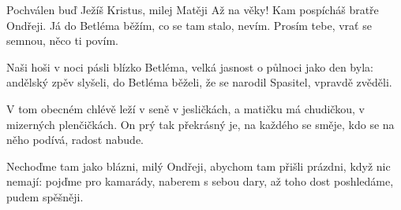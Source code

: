 \vskip-5mm
\IncludeLilypond

Pochválen buď Ježíš Kristus, milej Matěji
Až na věky! Kam pospícháš bratře Ondřeji.
Já do Betléma běžím, co se tam stalo, nevím.
Prosím tebe, vrať se semnou, něco ti povím.

Naši hoši v noci pásli blízko Betléma,
velká jasnost o půlnoci jako den byla:
andělský zpěv slyšeli, do Betléma běželi,
že se narodil Spasitel, vpravdě zvěděli.

V tom obecném chlévě leží v seně v jesličkách,
a matičku má chudičkou, v mizerných plenčičkách.
On prý tak překrásný je, na každého se směje,
kdo se na něho podívá, radost nabude.

Nechoďme tam jako blázni, milý Ondřeji,
abychom tam přišli prázdni, když nic nemají:
pojďme pro kamarády, naberem s sebou dary,
až toho dost poshledáme, pudem spěšněji.
